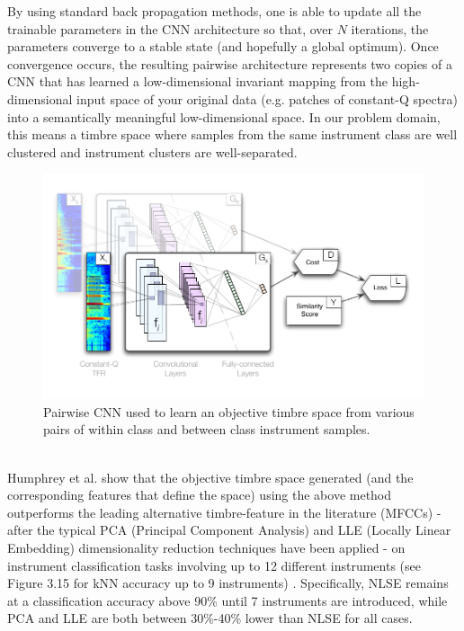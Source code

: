 \documentclass[a4paper,12pt]{report} 	%
\numberwithin{figure}{chapter}
\numberwithin{table}{chapter}
\numberwithin{equation}{chapter}
\begin{document}
\begin{flushleft}
By using standard back propagation methods, one is able to update all the trainable parameters in the CNN architecture so that, over $N$ iterations, the parameters converge to a stable state (and hopefully a global optimum). Once convergence occurs, the resulting pairwise architecture represents two copies of a CNN that has learned a low-dimensional invariant mapping from the high-dimensional input space of your original data (e.g. patches of constant-Q spectra) into a semantically meaningful low-dimensional space. In our problem domain, this means a timbre space where samples from the same instrument class are well clustered and instrument clusters are well-separated.
\begin{figure}[h!]
\begin{center}
\includegraphics[scale=0.95]{PairwiseCNN}
\caption[Pairwise CNN Architecture]{Pairwise CNN used to learn an objective timbre space from various pairs of within class and between class instrument samples.}
\end{center}
\end{figure}
\\
Humphrey et al. show that the objective timbre space generated (and the corresponding features that define the space) using the above method outperforms the leading alternative timbre-feature in the literature (MFCCs) - after the typical PCA (Principal Component Analysis) and LLE (Locally Linear Embedding) dimensionality reduction techniques have been applied - on instrument classification tasks involving up to 12 different instruments (see Figure 3.15 for kNN accuracy up to 9 instruments) \cite{Humphrey:2000th}. Specifically, NLSE remains at a classification accuracy above 90\% until 7 instruments are introduced, while PCA and LLE are both between 30\%-40\% lower than NLSE for all cases.
\begin{figure}[h!]

\end{figure}
\end{flushleft}
\end{document}
